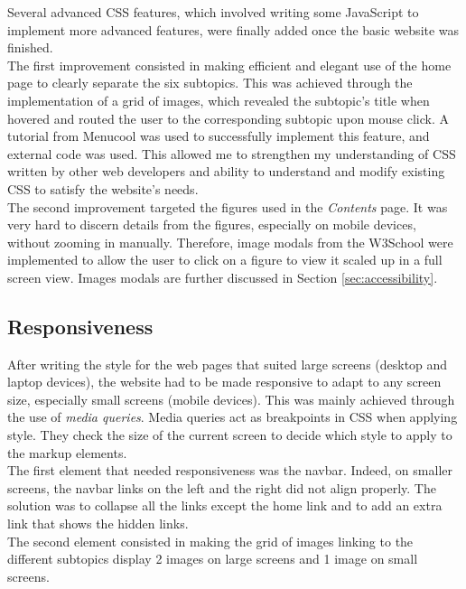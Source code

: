 \documentclass[letterpaper,12pt]{article}
\begin{document}
Several advanced CSS features, which involved writing some JavaScript to implement more advanced features, were finally added once the basic website was finished.\\

The first improvement consisted in making efficient and elegant use of the home page to clearly separate the six subtopics. This was achieved through the implementation of a grid of images, which revealed the subtopic's title when hovered and routed the user to the corresponding subtopic upon mouse click. A tutorial from Menucool was used to successfully implement this feature, and external code was used. This allowed me to strengthen my understanding of CSS written by other web developers and ability to understand and modify existing CSS to satisfy the website's needs.\\

The second improvement targeted the figures used in the \textit{Contents} page. It was very hard to discern details from the figures, especially on mobile devices, without zooming in manually. Therefore, image modals from the W3School were implemented to allow the user to click on a figure to view it scaled up in a full screen view. Images modals are further discussed in Section \ref{sec:accessibility}.

\subsection{Responsiveness}

After writing the style for the web pages that suited large screens (desktop and laptop devices), the website had to be made responsive to adapt to any screen size, especially small screens (mobile devices). This was mainly achieved through the use of \textit{media queries}. Media queries act as breakpoints in CSS when applying style. They check the size of the current screen to decide which style to apply to the markup elements.\\

The first element that needed responsiveness was the navbar. Indeed, on smaller screens, the navbar links on the left and the right did not align properly. The solution was to collapse all the links except the home link and to add an extra link that shows the hidden links.\\

The second element consisted in making the grid of images linking to the different subtopics display 2 images on large screens and 1 image on small screens.\\
\end{document}
